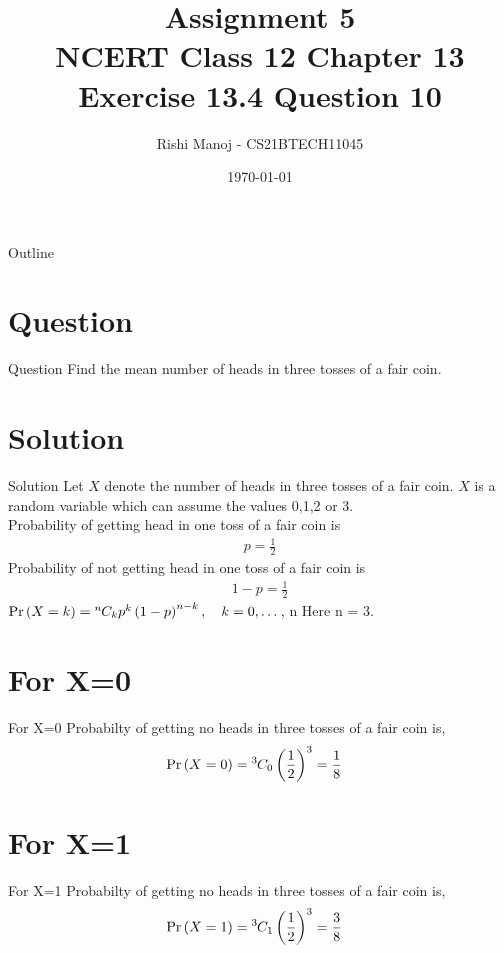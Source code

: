 \documentclass{beamer}
\title{Assignment 5 \\ NCERT Class 12 Chapter 13 Exercise 13.4 Question 10}
\author{Rishi Manoj - CS21BTECH11045}
\date{\today}
\providecommand{\pr}[1]{\ensuremath{\Pr\left(#1\right)}}
\providecommand{\brak}[1]{\ensuremath{\left(#1\right)}}
\newcommand*{\permcomb}[4][0mu]{{{}^{#3}\mkern#1#2_{#4}}}
\newcommand*{\comb}[1][-1mu]{\permcomb[#1]{C}}
\begin{document}
\begin{frame}
    \titlepage 
\end{frame}

\logo{}


\begin{frame}{Outline}
    \tableofcontents
\end{frame}


\section{Question}
\begin{frame}{Question}
Find the mean number of heads in three tosses of a fair coin.
\end{frame}


\section{Solution}
\begin{frame}{Solution}
Let $X$ denote the number of heads in three tosses of a fair coin. $X$ is a random variable which can assume the values 0,1,2 or 3.\\
	Probability of getting head in one toss of a fair coin is
	\begin{align}
	& p = \frac{1}{2} &
	\end{align}
	Probability of not getting head in one toss of a fair coin is
	\begin{align}
    & 1-p = \frac{1}{2} &
    \end{align}	
$\pr{X = k} = \comb{n}{k}p^k\brak{1-p}^{n-k}, \quad k = 0,\dots$, n 
	Here n = 3.
\end{frame}


\section{For X=0}
\begin{frame}{For X=0}
    Probabilty of getting no heads in three tosses of a fair coin is,
    \begin{align}
	&\pr{X = 0} = \comb{3}{0}\brak{\frac{1}{2}}^3 = \frac{1}{8} &
	\end{align}
\end{frame}


\section{For X=1}
\begin{frame}{For X=1}
    Probabilty of getting no heads in three tosses of a fair coin is,
    \begin{align}
	&\pr{X = 1} = \comb{3}{1}\brak{\frac{1}{2}}^3 = \frac{3}{8} &
	\end{align}
\end{frame}
\end{document}

